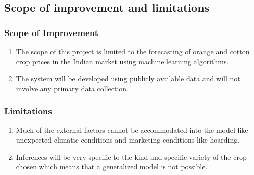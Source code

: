     \subsection{Scope of improvement and limitations}
        \subsubsection{Scope of Improvement}
            \begin{enumerate}
                \item
                    The scope of this project is limited to the forecasting of orange and cotton crop prices in the Indian market using machine learning algorithms.
                \item
                    The system will be developed using publicly available data and will not involve any primary data collection.
            \end{enumerate}
        
        \subsubsection{Limitations}
            \begin{enumerate}
                \item
                    Much of the external factors cannot be accommodated into the model like unexpected climatic conditions and marketing conditions like hoarding.
                \item
                    Inferences will be very specific to the kind and specific variety of the crop chosen which means that a generalized model is not possible.
            \end{enumerate}
